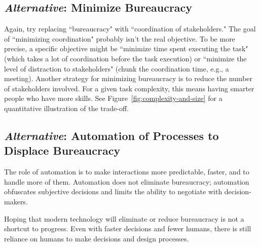\subsection*{\textit{Alternative}: Minimize Bureaucracy}
Again, try replacing ``bureaucracy" with ``coordination of stakeholders." The goal of ``minimizing coordination" probably isn't the real objective. To be more precise, a specific objective might be ``minimize time spent executing the task" (which takes a lot of coordination before the task execution) or ``minimize the level of distraction to stakeholders" (chunk the coordination time, e.g., a meeting). Another strategy for minimizing bureaucracy is to reduce the number of stakeholders involved. For a given task complexity, this means having smarter people who have more skills. See Figure~\ref{fig:complexity-and-size} for a quantitative illustration of the trade-off. 




\subsection*{\textit{Alternative}: Automation of Processes to Displace Bureaucracy\label{sec:automation}}

The role of automation is to make interactions more predictable, faster, and to handle more of them. Automation does not eliminate bureaucracy; automation obfuscates  subjective decisions and limits the ability to negotiate with decision-makers.

Hoping that modern technology will eliminate or reduce bureaucracy is not a shortcut to progress. 
Even with faster decisions and fewer humans, there is still reliance on humans to make decisions and design processes.

